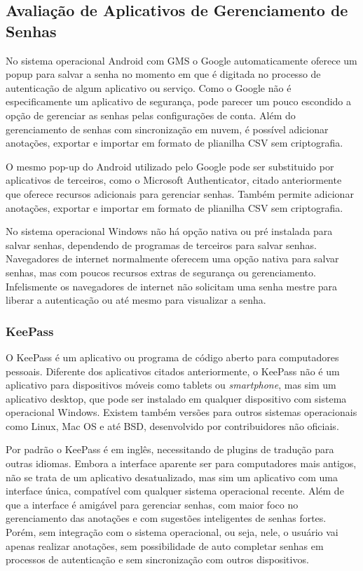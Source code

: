 \documentclass[12pt]{article}
\begin{document}
\subsection{Avaliação de Aplicativos de Gerenciamento de Senhas}

No sistema operacional Android com GMS o Google automaticamente oferece um popup
para salvar a senha no momento em que é digitada no processo de autenticação de
algum aplicativo ou serviço.
Como o Google não é especificamente um aplicativo de segurança, pode parecer um
pouco escondido a opção de gerenciar as senhas pelas configurações de conta.
Além do gerenciamento de senhas com sincronização em nuvem, é possível adicionar
anotações, exportar e importar em formato de plianilha CSV sem criptografia.

O mesmo pop-up do Android utilizado pelo Google pode ser substituido por
aplicativos de terceiros, como o Microsoft Authenticator, citado anteriormente
que oferece recursos adicionais para gerenciar senhas.
Também permite adicionar anotações, exportar e importar em formato de plianilha
CSV sem criptografia.

No sistema operacional Windows não há opção nativa ou pré instalada para
salvar senhas, dependendo de programas de terceiros para salvar senhas.
Navegadores de internet normalmente oferecem uma opção nativa para salvar senhas,
mas com poucos recursos extras de segurança ou gerenciamento.
Infelismente os navegadores de internet não solicitam uma senha mestre para liberar
a autenticação ou até mesmo para visualizar a senha.

\subsubsection{KeePass}

O KeePass é um aplicativo ou programa de código aberto para computadores pessoais.
Diferente dos aplicativos citados anteriormente, o KeePass não é um aplicativo
para dispositivos móveis como tablets ou \textit{smartphone}, mas sim um aplicativo desktop,
que pode ser instalado em qualquer dispositivo com sistema operacional Windows.
Existem também versões para outros sistemas operacionais como Linux, Mac OS e até
BSD, desenvolvido por contribuidores não oficiais.

Por padrão o KeePass é em inglês, necessitando de plugins de tradução para outras
idiomas.
Embora a interface aparente ser para computadores mais antigos, não se trata de um
aplicativo desatualizado, mas sim um aplicativo com uma interface única, compatível
com qualquer sistema operacional recente.
Além de que a interface é amigável para gerenciar senhas, com maior foco no gerenciamento
das anotações e com sugestões inteligentes de senhas fortes.
Porém, sem integração com o sistema operacional, ou seja, nele, o usuário vai apenas
realizar anotações, sem possibilidade de auto completar senhas em processos de autenticação
e sem sincronização com outros dispositivos.
\end{document}
